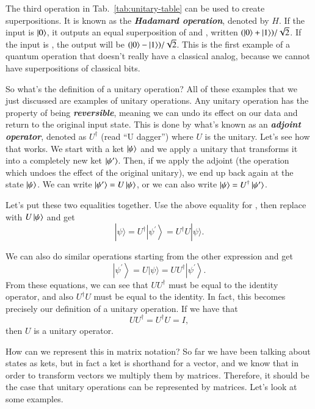 The third operation in Tab.~\ref{tab:unitary-table} can be used to create superpositions. It is known as the \textbf{\emph{Hadamard operation}}, denoted by $H$. If the input is $\left| 0 \right\rangle$, it outputs an equal superposition of  and , written $(\left| 0 \right\rangle+\left| 1 \right\rangle)/\sqrt{2}$. If the input is , the output will be $(\left| 0 \right\rangle-\left| 1 \right\rangle)/\sqrt{2}$. This is the first example of a quantum operation that doesn't really have a classical analog, because we cannot have superpositions of classical bits.

So what's the definition of a unitary operation? All of these examples that we just discussed are examples of unitary operations. Any unitary operation has the property of being \textbf{\emph{reversible}}, meaning we can undo its effect on our data and return to the original input state. This is done by what's known as an \textbf{\emph{adjoint operator}}, denoted as $U^\dagger$ (read ``U dagger'') where $U$ is the unitary.
Let's see how that works. We start with a ket $\left| \psi \right\rangle$ and we apply a unitary that transforms it into a completely new ket $\left| \psi' \right\rangle$. Then, if we apply the adjoint (the operation which undoes the effect of the original unitary), we end up back again at the state $\left| \psi \right\rangle$. We can write $\left| \psi' \right\rangle = U\left| \psi \right\rangle$, or we can also write $\left| \psi \right\rangle = U^\dagger\left| \psi' \right\rangle$. 

Let's put these two equalities together. Use the above equality for \ket{\psi}, then replace  with $U\left| \psi \right\rangle$ and get
\begin{equation}
|\psi\rangle=U^{\dagger}\left|\psi^{\prime}\right\rangle=U^{\dagger} U|\psi\rangle.
\end{equation} 

We can also do similar operations starting from the other expression and get
\begin{equation}
\left|\psi^{\prime}\right\rangle=U|\psi\rangle=U U^{\dagger}\left|\psi^{\prime}\right\rangle.
\end{equation}
From these equations,  we can see that $UU^\dagger$ must be equal to the identity operator, and also $U^\dagger U$ must be equal to the identity.
In fact, this becomes precisely our definition of a unitary operation.
If we have that 
\begin{equation}
U U^{\dagger}=U^{\dagger} U=I,
\end{equation}
then $U$ is a unitary operator.

How can we represent this in matrix notation? So far we have been talking about states as kets, but in fact a ket is shorthand for a vector, and we know that in order to transform vectors we multiply them by matrices. Therefore, it should be the case that unitary operations can be represented by matrices. Let's look at some examples. 

